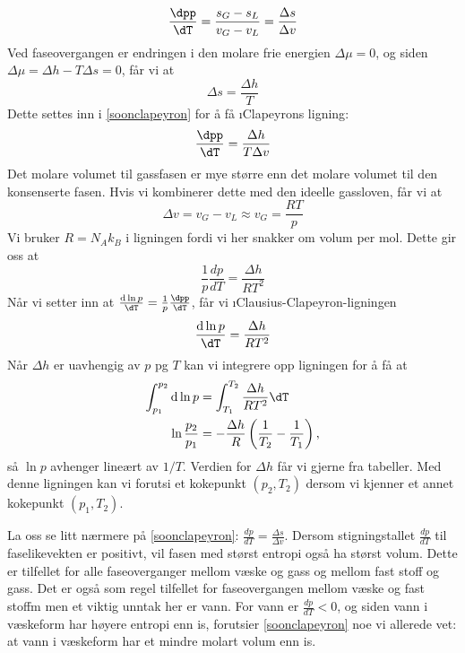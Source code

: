 \begin{equation}
	\label{soonclapeyron}
	\frac{\dpp}{\dT} = \frac{s_G-s_L}{v_G-v_L} = \frac{\Delta s}{\Delta v}
\end{equation}
Ved faseovergangen er endringen i den molare frie energien $\Delta \mu=0$, og siden $\Delta \mu = \Delta h - T\Delta s = 0$, får vi at
\begin{equation}
	\Delta s = \frac{\Delta h}{T}
\end{equation}
Dette settes inn i \eqref{soonclapeyron} for å få \i{Clapeyrons ligning}:
\begin{equation}
	\label{clapeyron}
	\frac{\dpp}{\dT} = \frac{\Delta h}{T\Delta v}
\end{equation}
Det molare volumet til gassfasen er mye større enn det molare volumet til den konsenserte fasen. Hvis vi kombinerer dette med den ideelle gassloven, får vi at
\begin{equation}
	\Delta v = v_G-v_L \approx v_G = \frac{RT}{p}
\end{equation}
Vi bruker $R=N_Ak_B$ i ligningen fordi vi her snakker om volum per mol. Dette gir oss at
\begin{equation}
	\frac{1}{p}\frac{dp}{dT}=\frac{\Delta h}{RT^2}
\end{equation}
Når vi setter inn at $\frac{\text{d}\ln p}{\dT}=\frac{1}{p}\frac{\dpp}{\dT}$, får vi \i{Clausius-Clapeyron-ligningen}
\begin{equation}
	\label{clausiusclapeyron}
	\frac{\text{d}\ln p}{\dT}=\frac{\Delta h}{RT^2}
\end{equation}
Når $\Delta h$ er uavhengig av $p$ pg $T$ kan vi integrere opp ligningen for å få at
\begin{align}
	\int_{p_1}^{p_2}\text{d}\ln p&=\int_{T_1}^{T_2}\frac{\Delta h}{RT^2}\dT \\ \ln\frac{p_2}{p_1}&=-\frac{\Delta h}{R}\left(\frac{1}{T_2}-\frac{1}{T_1}\right),
\end{align}
så $\ln p$ avhenger lineært av $1/T$. Verdien for $\Delta h$ får vi gjerne fra tabeller. Med denne ligningen kan vi forutsi et kokepunkt $(p_2,T_2)$ dersom vi kjenner et annet kokepunkt $(p_1,T_2)$.

La oss se litt nærmere på \eqref{soonclapeyron}: $\frac{dp}{dT} = \frac{\Delta s}{\Delta v}$. Dersom stigningstallet $\frac{dp}{dT}$ til faselikevekten er positivt, vil fasen med størst entropi også ha størst volum. Dette er tilfellet for alle faseoverganger mellom væske og gass og mellom fast stoff og gass. Det er også som regel tilfellet for faseovergangen mellom væske og fast stoffm men et viktig unntak her er vann. For vann er $\frac{dp}{dT}<0$, og siden vann i væskeform har høyere entropi enn is, forutsier \eqref{soonclapeyron} noe vi allerede vet: at vann i væskeform har et mindre molart volum enn is.

